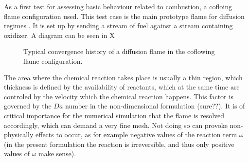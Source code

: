 As a first test for assessing basic behaviour related to combustion, a cofloing flame configuration used. This test case is the main prototype flame for diffusion regimes \cite{poinsotTheoreticalNumericalCombustion2005}. It is set up by sending a stream of fuel against a stream containing oxidizer. A diagram can be seen in X
\begin{figure}[t!]
	\centering
	\caption{Typical convergence history of a diffusion flame in the coflowing flame configuration. }
	\label{fig:CDF_ConvergenceStory}
\end{figure} 

The area where the chemical reaction takes place is usually a thin region, which thickness is defined by the availability of reactants, which at the same time are controled by the velocity which the chemical reaction happens. This factor is governed by the $Da$ number in the non-dimensional formulation (sure??). It is of critical importance for the numerical simulation that the flame is resolved accordingly, which can demand a very fine mesh. Not doing so can provoke non-physically effects to occur, as for example negative values of the reaction term $\omega$ (in the present formulation the reaction is irreversible, and thus only positive values of $\omega$ make sense). 

